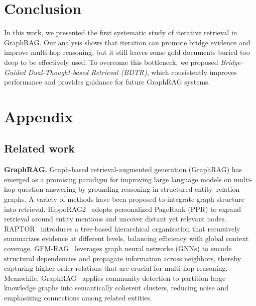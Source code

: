 \documentclass{article} %
\begin{document}
\section{Conclusion}
In this work, we presented the first systematic study of iterative retrieval in GraphRAG. Our analysis shows that iteration can promote bridge evidence and improve multi-hop reasoning, but it still leaves some gold documents buried too deep to be effectively used. To overcome this bottleneck, we proposed \emph{Bridge-Guided Dual-Thought-based Retrieval (BDTR)}, which consistently improves performance and provides guidance for future GraphRAG systems.







\appendix
\section{Appendix}


\subsection{Related work}
\label{Related}
\textbf{GraphRAG.} 
Graph-based retrieval-augmented generation (GraphRAG) has emerged as a promising paradigm for improving large language models on multi-hop question answering by grounding reasoning in structured entity–relation graphs. A variety of methods have been proposed to integrate graph structure into retrieval. HippoRAG2~\citep{gutierrez2025rag} adopts personalized PageRank (PPR) to expand retrieval around entity mentions and uncover distant yet relevant nodes. RAPTOR~\citep{sarthi2024raptor} introduces a tree-based hierarchical organization that recursively summarizes evidence at different levels, balancing efficiency with global context coverage. GFM-RAG~\citep{luo2025gfm} leverages graph neural networks (GNNs) to encode structural dependencies and propagate information across neighbors, thereby capturing higher-order relations that are crucial for multi-hop reasoning. Meanwhile, GraphRAG~\citep{edge2024local} applies community detection to partition large knowledge graphs into semantically coherent clusters, reducing noise and emphasizing connections among related entities.
\end{document}
